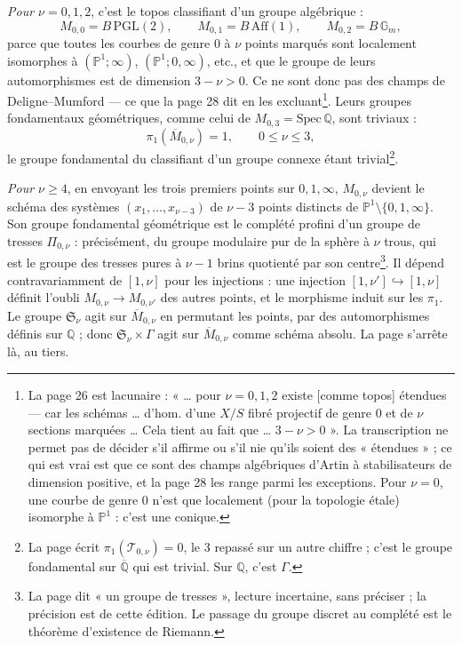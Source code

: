 \documentclass[11pt,a4paper]{article}
\begin{document}
\emph{Pour $\nu = 0, 1, 2$}, c'est le topos classifiant d'un groupe algébrique :
\[
M_{0,0} = B\,\mathrm{PGL}(2), \qquad M_{0,1} = B\,\mathrm{Aff}(1), \qquad
M_{0,2} = B\,\mathbb{G}_m,
\]
parce que toutes les courbes de genre $0$ à $\nu$ points marqués sont
localement isomorphes à $(\mathbb{P}^1; \infty)$, $(\mathbb{P}^1; 0, \infty)$,
etc., et que le groupe de leurs automorphismes est de dimension $3 - \nu > 0$.
Ce ne sont donc pas des champs de Deligne--Mumford — ce que la page 28 dit
en les excluant\footnote{La page 26 est lacunaire : « … pour $\nu = 0, 1, 2$
existe [comme topos] étendues — car les schémas … d'hom. d'une $X/S$ fibré
projectif de genre $0$ et de $\nu$ sections marquées … Cela tient au fait que …
$3 - \nu > 0$ ». La transcription ne permet pas de décider s'il affirme ou s'il
nie qu'ils soient des « étendues » ; ce qui est vrai est que ce sont des champs
algébriques d'Artin à stabilisateurs de dimension positive, et la page 28 les
range parmi les exceptions. Pour $\nu = 0$, une courbe de genre $0$ n'est que
localement (pour la topologie étale) isomorphe à $\mathbb{P}^1$ : c'est une
conique.}. Leurs groupes fondamentaux géométriques, comme celui de $M_{0,3} =
\mathrm{Spec}\,\mathbb{Q}$, sont triviaux :
\[
\pi_1(\overline{M}_{0,\nu}) = 1, \qquad 0 \leq \nu \leq 3,
\]
le groupe fondamental du classifiant d'un groupe connexe étant
trivial\footnote{La page écrit $\pi_1(\mathcal{T}_{0,\nu}) = 0$, le $3$ repassé
sur un autre chiffre ; c'est le groupe fondamental sur $\overline{\mathbb{Q}}$
qui est trivial. Sur $\mathbb{Q}$, c'est $\Gamma$.}.

\emph{Pour $\nu \geq 4$}, en envoyant les trois premiers points sur $0, 1,
\infty$, $M_{0,\nu}$ devient le schéma des systèmes $(x_1, \ldots, x_{\nu-3})$
de $\nu - 3$ points distincts de $\mathbb{P}^1 \setminus \{0, 1, \infty\}$.
Son groupe fondamental géométrique est le complété profini d'un groupe de
tresses $\Pi_{0,\nu}$ : précisément, du groupe modulaire pur de la sphère à
$\nu$ trous, qui est le groupe des tresses pures à $\nu - 1$ brins quotienté
par son centre\footnote{La page dit « un groupe de tresses », lecture incertaine,
sans préciser ; la précision est de cette édition. Le passage du groupe
discret au complété est le théorème d'existence de Riemann.}. Il dépend
contravariamment de $[1, \nu]$ pour les injections : une injection $[1, \nu']
\hookrightarrow [1, \nu]$ définit l'oubli $M_{0,\nu} \to M_{0,\nu'}$ des
autres points, et le morphisme induit sur les $\pi_1$. Le groupe
$\mathfrak{S}_\nu$ agit sur $\overline{M}_{0,\nu}$ en permutant les points, par
des automorphismes définis sur $\mathbb{Q}$ ; donc $\mathfrak{S}_\nu \times
\Gamma$ agit sur $\overline{M}_{0,\nu}$ comme schéma absolu. La page s'arrête
là, au tiers.
\end{document}
